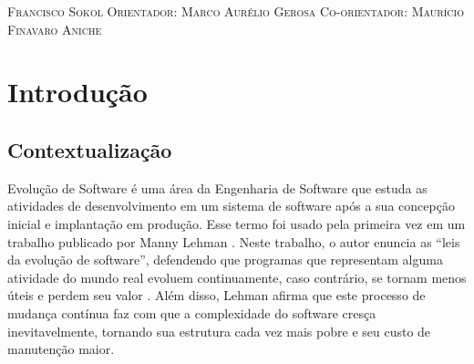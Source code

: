 \documentclass[a4paper, 12pt, twoside]{book}
\begin{document}
\begin{titlepage}
\vspace*{\fill}
\vspace{-5cm}
\vspace{2cm}
\center\textsc{{\Large Francisco Sokol}}
\vspace{1cm}
\center\textsc{{\large Orientador: Marco Aurélio Gerosa}}
\center\textsc{{\large Co-orientador: Maurício Finavaro Aniche}}
\vfill
\end{titlepage}


\pagestyle{plain}

\setcounter{page}{1}

\tableofcontents

\newpage

\chapter{Introdução}

    \section{Contextualização}
        Evolução de Software é uma área da Engenharia de Software que estuda as atividades de
        desenvolvimento em um sistema de software após a sua concepção inicial e implantação em
        produção. Esse termo foi usado pela primeira vez em um trabalho publicado por Manny 
        Lehman \cite{DBLP:series/springer/Mens08}. Neste trabalho, o autor enuncia as 
        ``leis da evolução de software'', defendendo que programas que representam alguma atividade
        do mundo real evoluem continuamente, caso contrário, se tornam menos úteis e perdem seu 
        valor \cite{Lehman1980b}. Além disso, Lehman afirma que este processo de mudança contínua
        faz com que a complexidade do software cresça inevitavelmente, tornando sua estrutura
        cada vez mais pobre e seu custo de manutenção maior.
        
\end{document}

